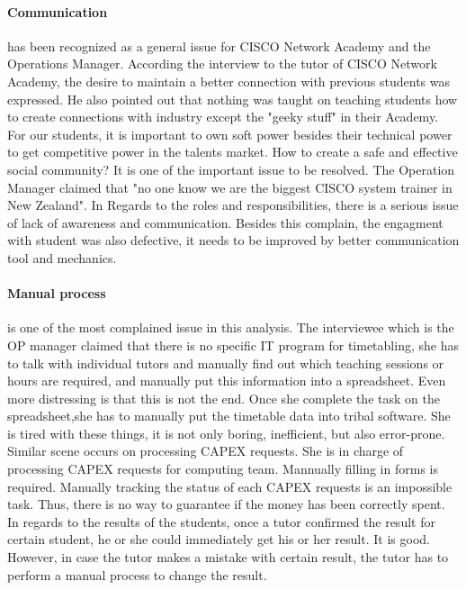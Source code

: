 \paragraph{Communication} has been recognized as a general issue for CISCO Network Academy and the Operations Manager. According the interview to the tutor of CISCO Network Academy, the desire to maintain a better connection with previous students was expressed. He also pointed out that nothing was taught on teaching students how to create connections with industry except the "geeky stuff" in their Academy. For our students, it is important to own soft power besides their technical power to get competitive power in the talents market. How to create a safe and effective social community? It is one of the important issue to be resolved. The Operation Manager claimed that "no one know we are the biggest CISCO system trainer in New Zealand". In Regards to the roles and responsibilities, there is a serious issue of lack of awareness and communication. Besides this complain, the engagment with student was also defective, it needs to be improved by better communication tool and mechanics.


\paragraph{Manual process} is one of the most complained issue in this analysis. The interviewee which is the OP manager claimed that there is no specific IT program for timetabling, she has to talk with individual tutors and manually find out which teaching sessions or hours are required, and manually put this information into a spreadsheet. Even more distressing is that this is not the end. Once she complete the task on the spreadsheet,she has to manually put the timetable data into tribal software. She is tired with these things, it is not only boring, inefficient, but also error-prone. Similar scene occurs on processing CAPEX requests. She is in charge of processing CAPEX requests for computing team. Mannually filling in forms is required. Manually tracking the status of each CAPEX requests is an impossible task. Thus, there is no way to guarantee if the money has been correctly spent. In regards to the results of the students, once a tutor confirmed the result for certain student, he or she  could immediately get his or her result. It is good. However, in case the tutor makes a mistake with certain result, the tutor has to perform a manual process to change the result.  

